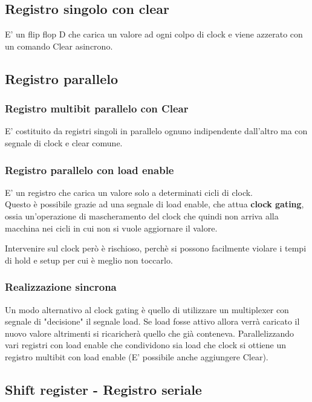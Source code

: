 \documentclass[a4paper]{book}
\begin{document}
\subsection*{Registro singolo con clear}

E' un flip flop D che carica un valore ad ogni colpo di clock e viene azzerato con un comando Clear asincrono.
\subsection{Registro parallelo}

\subsubsection*{Registro multibit parallelo con Clear}

E' costituito da registri singoli in parallelo ognuno indipendente dall'altro ma con segnale di clock e clear comune.

\subsubsection*{Registro parallelo con load enable}

E' un registro che carica un valore solo a determinati cicli di clock.\\
Questo è possibile grazie ad una segnale di load enable, che attua \textbf{clock gating}, ossia un'operazione di mascheramento del clock che quindi non arriva alla macchina nei cicli in cui non si vuole aggiornare il valore.

Intervenire sul clock però è rischioso, perchè si possono facilmente violare i tempi di hold e setup per cui è meglio non toccarlo.


\subsubsection*{Realizzazione sincrona}

Un modo alternativo al clock gating è quello di utilizzare un multiplexer con segnale di "decisione" il segnale load.
Se load fosse attivo allora verrà caricato il nuovo valore altrimenti si ricaricherà quello che già conteneva.
Parallelizzando vari registri con load enable che condividono sia load che clock si ottiene un registro multibit con load enable (E' possibile anche aggiungere Clear).

\subsection*{Shift register - Registro seriale}
\end{document}
